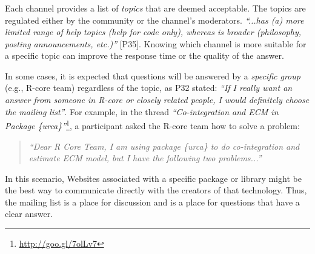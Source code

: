 \subsubsection{\reca}


    Each channel provides a list of \textit{topics} that are deemed acceptable.
    The topics are regulated either by the community or the channel's moderators. \textit{``...\SO has (a) more limited range of help topics (help for code only), whereas \RH is broader (philosophy, posting announcements, etc.)''} [P35].
    Knowing which channel is more suitable for a specific topic can improve the response time or the quality of the answer.


    In some cases, it is expected that questions will be answered by a \textit{specific group} (e.g., R-core team) regardless of the topic, as P32 stated: \textit{``If I really want an answer from someone in R-core or closely related people, I would definitely choose the mailing list''}.
    For example, in the \RH thread \textit{``Co-integration and ECM in Package \{urca\}''}\footnote{\url{http://goo.gl/7olLv7}}, a participant asked the R-core team how to solve a problem: 
     \begin{quote}
     \textit{``Dear R Core Team, I am using package \{urca\} to do co-integration and estimate ECM model, but I have the following two problems...''}
     \end{quote}
    In this scenario, Websites associated with a specific package or library might be the best way to communicate directly with the creators of that technology. Thus, the \RH mailing list is a place for discussion and \SO is a place for questions that have a clear answer.

     


